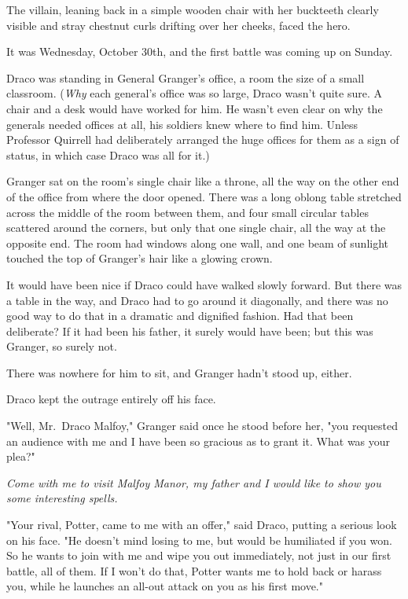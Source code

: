 The villain, leaning back in a simple wooden chair with her buckteeth clearly 
visible and stray chestnut curls drifting over her cheeks, faced the hero.

It was Wednesday, October 30th, and the first battle was coming up on Sunday.

Draco was standing in General Granger's office, a room the size of a small 
classroom. (\emph{Why} each general's office was so large, Draco wasn't quite 
sure. A chair and a desk would have worked for him. He wasn't even clear on why 
the generals needed offices at all, his soldiers knew where to find him. Unless 
Professor Quirrell had deliberately arranged the huge offices for them as a 
sign of status, in which case Draco was all for it.)

Granger sat on the room's single chair like a throne, all the way on the other 
end of the office from where the door opened. There was a long oblong table 
stretched across the middle of the room between them, and four small circular 
tables scattered around the corners, but only that one single chair, all the 
way at the opposite end. The room had windows along one wall, and one beam of 
sunlight touched the top of Granger's hair like a glowing crown.

It would have been nice if Draco could have walked slowly forward. But there 
was a table in the way, and Draco had to go around it diagonally, and there was 
no good way to do that in a dramatic and dignified fashion. Had that been 
deliberate? If it had been his father, it surely would have been; but this was 
Granger, so surely not.

There was nowhere for him to sit, and Granger hadn't stood up, either.

Draco kept the outrage entirely off his face.

"Well, Mr.~Draco Malfoy," Granger said once he stood before her, "you requested 
an audience with me and I have been so gracious as to grant it. What was your 
plea?"

\emph{Come with me to visit Malfoy Manor, my father and I would like to show 
you some interesting spells.\\
}

"Your rival, Potter, came to me with an offer," said Draco, putting a serious 
look on his face. "He doesn't mind losing to me, but would be humiliated if you 
won. So he wants to join with me and wipe you out immediately, not just in our 
first battle, all of them. If I won't do that, Potter wants me to hold back or 
harass you, while he launches an all-out attack on you as his first move."

